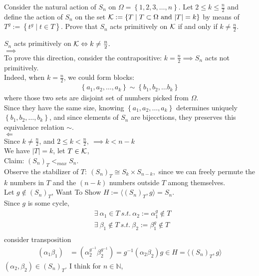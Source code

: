 \documentclass{article}
\begin{document}
\begin{homeworkProblem}
    Consider the natural action of $S_n$ on $\Omega = \left\{ 1,2,3, \ldots, n \right\}$.
    Let $2 \leq k \leq \frac{ n }{ 2 }$ and define the action of $S_n$
    on the set $\mathcal K := \left\{ T \mid T \subset \Omega \ \text{and} \ \lvert T \rvert = k \right\}$
    by means of $T^g := \left\{ t^g \mid t \in T \right\}$.
    Prove that $S_n$ acts primitively on $\mathcal K$ 
    if and only if $k \neq \frac{ n }{ 2 }$.\\
    \solution

    $S_n$ acts primitively on $\mathcal K \Leftrightarrow k \neq \frac{ n }{ 2 }.$\\
    $\implies$ \\
    To prove this direction, consider the contrapositive: 
    $k = \frac{ n }{ 2 } \implies S_n$ acts not primitively.\\
    Indeed, when $k = \frac{ n }{ 2 }$, we could form blocks:
    \begin{align}
        \left\{ a_1, a_2, \ldots, a_k \right\} \sim \left\{ b_1, b_2, \ldots b_k \right\}
    \end{align}
    where those two sets are disjoint set of numbers picked from $\Omega$.\\
    Since they have the same size, knowing $\left\{ a_1, a_2, \ldots, a_k \right\}$
    determines uniquely $\left\{ b_1, b_2, \ldots, b_k \right\}$,
    and since elements of $S_n$ are bijecctions, 
    they preserves this equivalence relation $\sim$.\\

    $\Leftarrow$\\
    Since $k \neq \frac{ n }{ 2 }$, and $2 \leq k < \frac{ n }{ 2 }, \ \implies k < n - k$ \\
    We have $\lvert T \rvert = k$, let $T \in \mathcal K$, \\
    Claim: $(S_n)_T <_{max} S_n$.\\
    Observe the stabilizer of $T: \ (S_n)_T \cong S_k \times S_{n-k},$ 
    since we can freely permute the $k$ numbers in $T$ and the
    $(n-k)$ numbers outside $T$ among themselves.\\
    Let $g \not\in (S_n)_T$, Want To Show 
    $H := \langle (S_n)_T, g \rangle = S_n$.\\
    Since $g$ is some cycle, 
    \begin{align}
        &\exists \ \alpha_1 \in T \ s.t. \ \alpha_2 := \alpha_1^{g} \not\in T\\
        &\exists \ \beta_1 \not\in T \ s.t. \ \beta_2 := \beta_1^{g} \not\in T\\
    \end{align}
    consider transposition
    \begin{align}
        (\alpha_1 \beta_1) &= (\alpha_2^{g^{-1}} \beta_2^{g^{-1}}) 
        = g^{-1}(\alpha_2 \beta_2) g \in H = \langle (S_n)_T, g \rangle
    \end{align}
    $(\alpha_2, \beta_2) \in (S_n)_T$.
    I think for $n \in \mathbb{N}$, 
    
    

    
    
\end{homeworkProblem}
\end{document}
